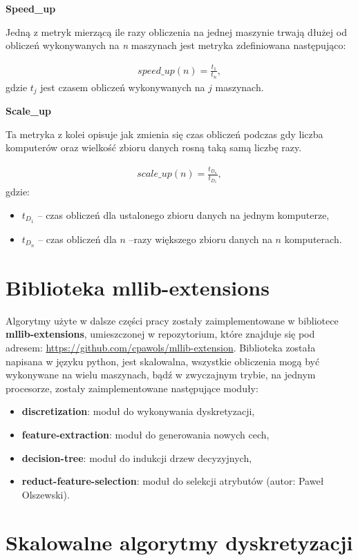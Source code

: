 \documentclass[magisterska]{pracamgr}
\theoremstyle{plain}
\theoremstyle{definition}
\theoremstyle{remark}
\begin{document}
\textbf{Speed\_up}
 
Jedną z metryk mierzącą ile razy obliczenia na jednej maszynie trwają dłużej od
obliczeń wykonywanych na \emph{n} maszynach jest metryka zdefiniowana następująco:
 
\begin{align*}
 speed\_up(n) = \frac{t_1}{t_n},
\end{align*}
gdzie $t_j$ jest czasem obliczeń wykonywanych na $j$ maszynach.
 
\textbf{Scale\_up}
 
Ta metryka z kolei opisuje jak zmienia się czas obliczeń podczas gdy
liczba komputerów oraz wielkość zbioru danych rosną taką samą liczbę razy.
 
\begin{align*}
 scale\_up(n) = \frac{t_{D_n}}{t_{D_1}},
\end{align*}
gdzie:
\begin{itemize}
 \item $t_{D_1}$ -- czas obliczeń dla ustalonego zbioru danych na jednym komputerze,
 \item $t_{D_n}$ -- czas obliczeń dla $n$ --razy większego zbioru danych na $n$ komputerach.
\end{itemize}

\chapter{Biblioteka mllib-extensions}
Algorytmy użyte w dalsze części pracy zostały zaimplementowane w bibliotece \textbf{mllib-extensions},
umieszczonej w repozytorium, które znajduje się pod adresem: \url{https://github.com/cpawols/mllib-extension}.
Biblioteka została napisana w języku python,
jest skalowalna, wszystkie obliczenia mogą być wykonywane na wielu maszynach, bądź w zwyczajnym trybie, 
na jednym procesorze, zostały zaimplementowane następujące moduły:
  \begin{itemize}
   \item \textbf{discretization}: moduł do wykonywania dyskretyzacji,
   \item \textbf{feature-extraction}: moduł do generowania nowych cech,
   \item \textbf{decision-tree}: moduł do indukcji drzew decyzyjnych,
   \item \textbf{reduct-feature-selection}: moduł do selekcji atrybutów (autor: Paweł Olszewski).
  \end{itemize}


\chapter{Skalowalne algorytmy dyskretyzacji}
\end{document}
